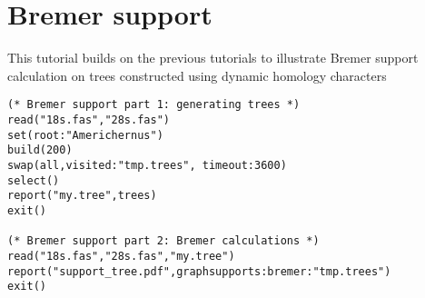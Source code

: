 \section{Bremer support}{\label{tutorial4.3}}

This tutorial builds on the previous tutorials to illustrate Bremer support 
calculation on trees constructed using dynamic homology characters
    
   \begin{verbatim}
(* Bremer support part 1: generating trees *)
read("18s.fas","28s.fas")
set(root:"Americhernus")
build(200)
swap(all,visited:"tmp.trees", timeout:3600)
select()
report("my.tree",trees)
exit()

(* Bremer support part 2: Bremer calculations *)
read("18s.fas","28s.fas","my.tree")
report("support_tree.pdf",graphsupports:bremer:"tmp.trees")
exit()
\end{verbatim}

